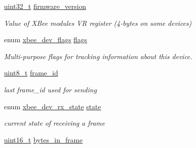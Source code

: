 \begin{DoxyCompactItemize}
\mbox{\label{group__xbee__device_gac8e0f35fdeff288dd1a7b4f49754c9b2}} 
\hyperlink{group__hal__dos_ga09a1e304d66d35dd47daffee9731edaa}{uint32\+\_\+t} \hyperlink{group__xbee__device_gac8e0f35fdeff288dd1a7b4f49754c9b2}{firmware\+\_\+version}
\begin{DoxyCompactList}\small\item\em Value of X\+Bee module\textquotesingle{}s VR register (4-\/bytes on some devices) \end{DoxyCompactList}\item 
\mbox{\label{group__xbee__device_ga9ac684521a8154bddc272049a7a61b73}} 
enum \hyperlink{group__xbee__device_ga80478d6b87ebdf34b5ec06e5ca6f309e}{xbee\+\_\+dev\+\_\+flags} \hyperlink{group__xbee__device_ga9ac684521a8154bddc272049a7a61b73}{flags}
\begin{DoxyCompactList}\small\item\em Multi-\/purpose flags for tracking information about this device. \end{DoxyCompactList}\item 
\mbox{\label{group__xbee__device_ga03c1016ac46b9df250b994f242cf956a}} 
\hyperlink{group__hal__dos_gae1affc9ca37cfb624959c866a73f83c2}{uint8\+\_\+t} \hyperlink{group__xbee__device_ga03c1016ac46b9df250b994f242cf956a}{frame\+\_\+id}
\begin{DoxyCompactList}\small\item\em last frame\+\_\+id used for sending \end{DoxyCompactList}\item 
\mbox{\label{group__xbee__device_ga758a79cfaf819f091728c06474466321}} 
enum \hyperlink{group__xbee__device_ga30374ada0aff261c5da7557882fd09de}{xbee\+\_\+dev\+\_\+rx\+\_\+state} \hyperlink{group__xbee__device_ga758a79cfaf819f091728c06474466321}{state}
\begin{DoxyCompactList}\small\item\em current state of receiving a frame \end{DoxyCompactList}\item 
\mbox{\label{group__xbee__device_ga1048ca0eb1adc5759a0df48ae8ae740a}} 
\hyperlink{group__hal__dos_ga5a8b2dc9e45a9ee81a94ef304fb62505}{uint16\+\_\+t} \hyperlink{group__xbee__device_ga1048ca0eb1adc5759a0df48ae8ae740a}{bytes\+\_\+in\+\_\+frame}

\end{DoxyCompactItemize}
